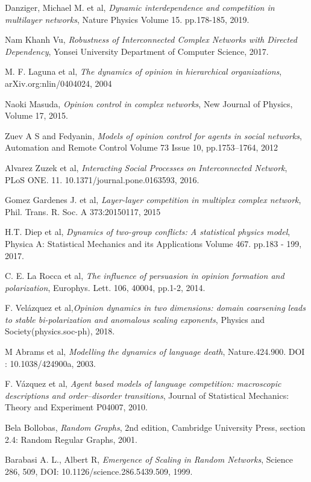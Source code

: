 \documentclass[english]{cccconf}
\begin{document}
\begin{thebibliography}{0}
Danziger, Michael M. et al, \textit{Dynamic interdependence and competition in multilayer networks}, Nature Physics Volume 15. pp.178-185, 2019.

Nam Khanh Vu, \textit{Robustness of Interconnected Complex Networks with Directed Dependency}, Yonsei University Department of Computer Science, 2017.

M. F. Laguna et al, \textit{The dynamics of opinion in hierarchical organizations}, arXiv.org:nlin/0404024, 2004 

Naoki Masuda, \textit{Opinion control in complex networks}, New Journal of Physics, Volume 17, 2015.

Zuev A S and Fedyanin, 
\textit{Models of opinion control for agents in social networks}, Automation and Remote Control Volume 73 Issue 10, pp.1753–1764, 2012 








Alvarez Zuzek et al, \textit{Interacting Social Processes on Interconnected Network}, PLoS ONE. 11. 10.1371/journal.pone.0163593, 2016.

Gomez Gardenes J. et al, \textit{Layer-layer competition in multiplex complex network}, Phil. Trans. R. Soc. A 373:20150117, 2015

H.T. Diep et al, \textit{Dynamics of two-group conflicts: A statistical physics model}, Physica A: Statistical Mechanics and its Applications Volume 467. pp.183 - 199, 2017.

C. E. La Rocca et al, \textit{The influence of persuasion in opinion formation and polarization}, Europhys. Lett. 106, 40004, pp.1-2, 2014.

F. Vel{\'a}zquez et al,\textit{Opinion dynamics in two dimensions: domain coarsening leads to stable bi-polarization and anomalous scaling exponents}, Physics and Society(physics.soc-ph), 2018. 








M Abrams et al, \textit{Modelling the dynamics of language death}, Nature.424.900. DOI : 10.1038/424900a, 2003.

 F. V{\'a}zquez et al, \textit{Agent based models of language competition: macroscopic descriptions and order–disorder transitions}, Journal of Statistical Mechanics: Theory and Experiment P04007, 2010.

 Bela Bollobas, \textit{Random Graphs}, 2nd edition, Cambridge University Press, section 2.4: Random Regular Graphs, 2001.

Barabasi A. L., Albert R, \textit{Emergence of Scaling in Random Networks}, Science 286, 509, DOI: 10.1126/science.286.5439.509, 1999.



\end{thebibliography}
\end{document}
